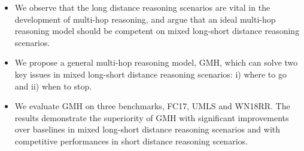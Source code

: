\begin{itemize}[leftmargin=-1pt,topsep = -1 pt,partopsep= 1 pt,labelwidth=3pt,labelsep= 1 pt]
    \setlength{\itemsep}{0pt}
    \setlength{\parsep}{0pt}
    \setlength{\parskip}{0pt}
    \item We observe that the long distance reasoning scenarios are vital in the development of multi-hop reasoning, and argue that an ideal multi-hop reasoning model should be competent on mixed long-short distance reasoning scenarios.
    \item We propose a general multi-hop reasoning model, GMH, which can solve two key issues in mixed long-short distance reasoning scenarios: i) where to go and ii) when to stop.


    \item We evaluate GMH on three benchmarks, FC17, UMLS and WN18RR. The results demonstrate the superiority of GMH with significant improvements over baselines in mixed long-short distance reasoning scenarios and with competitive performances in short distance reasoning scenarios. 
\end{itemize}


